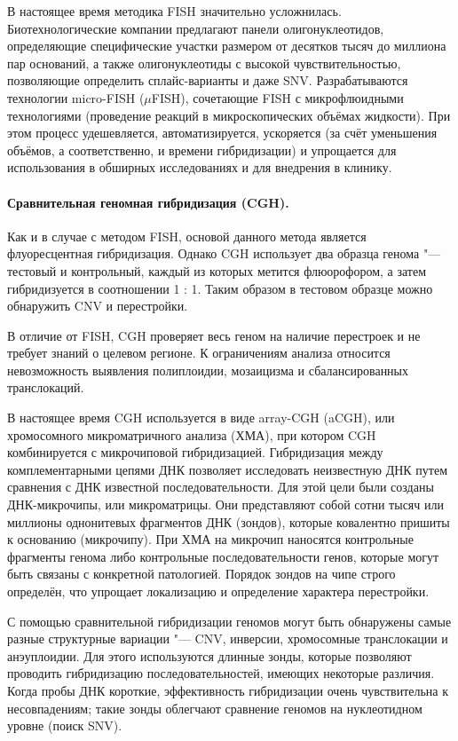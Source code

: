 \documentclass[a4paper,12pt]{article}
\begin{document}
В настоящее время методика FISH значительно усложнилась.
Биотехнологические компании предлагают панели олигонуклеотидов, определяющие специфические участки размером от десятков тысяч до миллиона пар оснований, а также олигонуклеотиды с высокой чувствительностью, позволяющие определить сплайс-варианты и даже SNV.
Разрабатываются технологии micro-FISH ($\mu$FISH), сочетающие FISH с микрофлюидными технологиями (проведение реакций в микроскопических объёмах жидкости).
При этом процесс удешевляется, автоматизируется, ускоряется (за счёт уменьшения объёмов, а соответственно, и времени гибридизации) и упрощается для использования в обширных исследованиях и для внедрения в клинику\cite{Huber_2018}.

\paragraph{Сравнительная геномная гибридизация (CGH).}
Как и в случае с методом FISH, основой данного метода является флуоресцентная гибридизация.
Однако CGH использует два образца генома "--- тестовый и контрольный, каждый из которых метится флюорофором, а затем гибридизуется в соотношении 1 : 1.
Таким образом в тестовом образце можно обнаружить CNV и перестройки.

В отличие от FISH, CGH проверяет весь геном на наличие перестроек и не требует знаний о целевом регионе.
К ограничениям анализа относится невозможность выявления полиплоидии, мозаицизма и сбалансированных транслокаций.

В настоящее время CGH используется в виде array-CGH (aCGH), или хромосомного микроматричного анализа (ХМА), при котором CGH комбинируется с микрочиповой гибридизацией\cite{theisen}.
Гибридизация между комплементарными цепями ДНК позволяет исследовать неизвестную ДНК путем сравнения с ДНК известной последовательности.
Для этой цели были созданы ДНК-микрочипы, или микроматрицы.
Они представляют собой сотни тысяч или миллионы однонитевых фрагментов ДНК (зондов), которые ковалентно пришиты к основанию (микрочипу).
При ХМА на микрочип наносятся контрольные фрагменты генома либо контрольные последовательности генов, которые могут быть связаны с конкретной патологией.
Порядок зондов на чипе строго определён, что упрощает локализацию и определение характера перестройки.
    
С помощью сравнительной гибридизации геномов могут быть обнаружены самые разные структурные вариации "--- CNV, инверсии, хромосомные транслокации и анэуплоидии.
Для этого используются длинные зонды, которые позволяют проводить гибридизацию последовательностей, имеющих некоторые различия.
Когда пробы ДНК короткие, эффективность гибридизации очень чувствительна к несовпадениям; такие зонды облегчают сравнение геномов на нуклеотидном уровне (поиск SNV).
\end{document}
